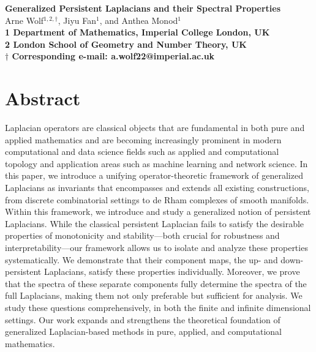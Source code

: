 \documentclass[11pt]{article}
\theoremstyle{definition}
\theoremstyle{remark}
\begin{document}
\def\spacingset#1{\renewcommand{\baselinestretch}%
{#1}\small\normalsize} \spacingset{1}


\begin{flushleft}
{\Large{\textbf{Generalized Persistent Laplacians and their Spectral Properties}}}
\newline
\\
Arne Wolf$^{1,2,\dagger}$, Jiyu Fan$^{1}$, and  Anthea Monod$^{1}$
\\
\bigskip
\bf{1} Department of Mathematics, Imperial College London, UK
\\
\bf{2} London School of Geometry and Number Theory, UK
\\
\bigskip
$\dagger$ Corresponding e-mail: a.wolf22@imperial.ac.uk
\end{flushleft}


\section*{Abstract}

Laplacian operators are classical objects that are fundamental in both pure and applied mathematics and are becoming increasingly prominent in modern computational and data science fields such as applied and computational topology and application areas such as machine learning and network science.  In this paper, we introduce a unifying operator-theoretic framework of generalized Laplacians as invariants that encompasses and extends all existing constructions, from discrete combinatorial settings to de Rham complexes of smooth manifolds.  Within this framework, we introduce and study a generalized notion of persistent Laplacians. While the classical persistent Laplacian fails to satisfy the desirable properties of monotonicity and stability---both crucial for robustness and interpretability---our framework allows us to isolate and analyze these properties systematically.  We demonstrate that their component maps, the up- and down-persistent Laplacians, satisfy these properties individually. Moreover, we prove that the spectra of these separate components fully determine the spectra of the full Laplacians, making them not only preferable but sufficient for analysis.  We study these questions comprehensively, in both the finite and infinite dimensional settings. Our work expands and strengthens the theoretical foundation of generalized Laplacian-based methods in pure, applied, and computational mathematics.
\end{document}
